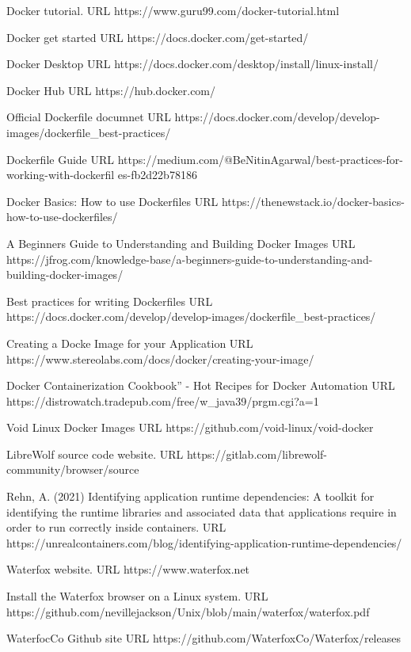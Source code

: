 \documentclass{article}  %
\begin{document}
\begin{thebibliography}{99}

Docker tutorial.
URL https://www.guru99.com/docker-tutorial.html

Docker get started
URL https://docs.docker.com/get-started/

Docker Desktop
URL https://docs.docker.com/desktop/install/linux-install/

Docker Hub
URL https://hub.docker.com/

Official Dockerfile documnet
URL https://docs.docker.com/develop/develop-images/dockerfile\_best-practices/


Dockerfile Guide
URL https://medium.com/@BeNitinAgarwal/best-practices-for-working-with-dockerfil
es-fb2d22b78186

Docker Basics: How to use Dockerfiles
URL https://thenewstack.io/docker-basics-how-to-use-dockerfiles/

A Beginners Guide to Understanding and Building Docker Images
URL https://jfrog.com/knowledge-base/a-beginners-guide-to-understanding-and-building-docker-images/

Best practices for writing Dockerfiles
URL https://docs.docker.com/develop/develop-images/dockerfile\_best-practices/


Creating a Docke Image for your Application
URL https://www.stereolabs.com/docs/docker/creating-your-image/

Docker Containerization Cookbook” - Hot Recipes for Docker Automation
URL https://distrowatch.tradepub.com/free/w\_java39/prgm.cgi?a=1

Void Linux Docker Images
URL https://github.com/void-linux/void-docker


LibreWolf source code website.
URL https://gitlab.com/librewolf-community/browser/source

Rehn, A. (2021)
Identifying application runtime dependencies: A toolkit for identifying the runtime libraries and associated data that applications require in order to run correctly inside containers. 
URL https://unrealcontainers.com/blog/identifying-application-runtime-dependencies/

Waterfox website. URL https://www.waterfox.net

Install the Waterfox browser on a Linux system. URL https://github.com/nevillejackson/Unix/blob/main/waterfox/waterfox.pdf

WaterfocCo Github site URL https://github.com/WaterfoxCo/Waterfox/releases

\end{thebibliography}
\end{document}
